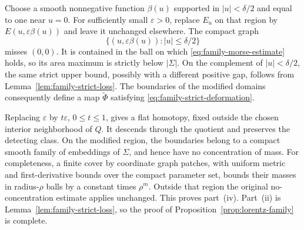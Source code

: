 Choose a smooth nonnegative function $\beta(u)$ supported in
$|u|<\delta/2$ and equal to one near $u=0$.
For sufficiently small $\varepsilon>0$, replace $E_u$ on that region
by $E(u,\varepsilon\beta(u))$ and leave it unchanged elsewhere.
The compact graph
\[
 \{(u,\varepsilon\beta(u)):|u|\le\delta/2\}
\]
misses $(0,0)$.  It is contained in the ball on which
\eqref{eq:family-morse-estimate} holds, so its area maximum is
strictly below $|\Sigma|$.
On the complement of $|u|<\delta/2$, the same strict upper bound,
possibly with a different positive gap, follows from
Lemma~\ref{lem:family-strict-loss}.
The boundaries of the modified domains consequently define a map
$\widetilde\Phi$ satisfying \eqref{eq:family-strict-deformation}.

Replacing $\varepsilon$ by $t\varepsilon$, $0\le t\le1$, gives a
flat homotopy, fixed outside the chosen interior neighborhood of $Q$.
It descends through the quotient and preserves the detecting class.
On the modified region, the boundaries belong to a compact smooth
family of embeddings of $\Sigma$, and hence have no concentration
of mass.  For completeness, a finite cover by coordinate graph
patches, with uniform metric and first-derivative bounds over the
compact parameter set, bounds their masses in radius-$\rho$ balls
by a constant times $\rho^m$.  Outside that region the original
no-concentration estimate applies unchanged.
This proves part~\textup{(iv)}.  Part~\textup{(ii)} is
Lemma~\ref{lem:family-strict-loss}, so the proof of
Proposition~\ref{prop:lorentz-family} is complete.
